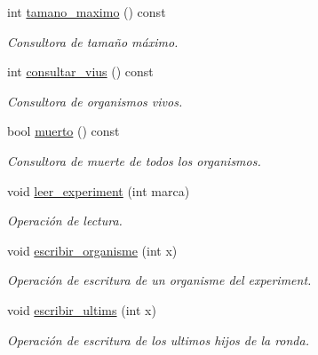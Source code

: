 \begin{DoxyCompactItemize}
int \hyperlink{class_experiment_a333c9c8084c76beb6b8848b8f2efec25}{tamano\-\_\-maximo} () const 
\begin{DoxyCompactList}\small\item\em Consultora de tamaño máximo. \end{DoxyCompactList}\item 
int \hyperlink{class_experiment_a1f1307d2224b32b4b642b7e545f655f6}{consultar\-\_\-vius} () const 
\begin{DoxyCompactList}\small\item\em Consultora de organismos vivos. \end{DoxyCompactList}\item 
bool \hyperlink{class_experiment_af08a77ada723ccaaf6476a3c1331261c}{muerto} () const 
\begin{DoxyCompactList}\small\item\em Consultora de muerte de todos los organismos. \end{DoxyCompactList}\item 
void \hyperlink{class_experiment_a02185fb874c9439991a68ab436d084bf}{leer\-\_\-experiment} (int marca)
\begin{DoxyCompactList}\small\item\em Operación de lectura. \end{DoxyCompactList}\item 
void \hyperlink{class_experiment_ac2ae9b839376abeac7f65aaea846e70e}{escribir\-\_\-organisme} (int x)
\begin{DoxyCompactList}\small\item\em Operación de escritura de un organisme del experiment. \end{DoxyCompactList}\item 
void \hyperlink{class_experiment_a7306fc6afaffe4783774d58e05efc10c}{escribir\-\_\-ultims} (int x)
\begin{DoxyCompactList}\small\item\em Operación de escritura de los ultimos hijos de la ronda. \end{DoxyCompactList}\end{DoxyCompactItemize}
